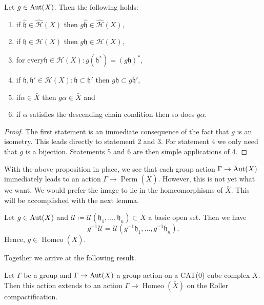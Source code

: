 \begin{prop}
  Let \(g \in \operatorname{Aut}(X)\). Then the following holds:
  \begin{enumerate}
  \item if \(\mathfrak{\hat h} \in \mathcal{\hat H}(X)\) then \( g\mathfrak{\hat h} \in \mathcal{\hat H}(X)\),
  \item if \(\mathfrak{h} \in \mathcal{H}(X)\) then \( g\mathfrak{h} \in \mathcal{H}(X)\),
  \item for every\(\mathfrak{h} \in \mathcal{H}(X)\colon g(\mathfrak{h}^\ast) = (g\mathfrak{h})^\ast\),
  \item if \(\mathfrak{h,h'} \in \mathcal{H}(X)\colon \mathfrak{h} \subset \mathfrak{h'}\) then \(g\mathfrak{h} \subset g\mathfrak{h'}\),
  \item if\(\alpha \in \bar X\) then \(g\alpha \in \bar X\) and
  \item if \(\alpha\) satisfies the descending chain condition then so does \(g\alpha\).
  \end{enumerate}
\end{prop}

\begin{proof}
  The first statement is an immediate consequence of the fact that \(g\) is an isometry. This leads directly to statement 2 and 3. For statement 4 we only need that \(g\) is a bijection. Statements 5 and 6 are then simple applications of 4.
\end{proof}

With the above proposition in place, we see that each group action \(\Gamma \to \operatorname{Aut}(X)\) immediately leads to an action \(\Gamma \to \operatorname{Perm}(\bar X)\). However, this is not yet what we want. We would prefer the image to lie in the homeomorphisms of \(\bar X\). This will be accomplished with the next lemma.

\begin{lemma}
  Let \(g \in \operatorname{Aut}(X)\) and \(\mathcal{U} \coloneqq \mathcal{U}(\mathfrak{h}_1, \dots, \mathfrak{h}_n) \subset \bar X\) a basic open set. Then we have
  \[
    g^{-1} \mathcal{U} = \mathcal{U}(g^{-1}\mathfrak{h}_1, \dots, g^{-1}\mathfrak{h}_n).
  \]
  Hence, \(g \in \operatorname{Homeo}(\bar X)\).
\end{lemma}

Together we arrive at the following result.

\begin{thm}
  \label{thm:roller-action}
  Let \(\Gamma\) be a group and \(\Gamma \to \operatorname{Aut}(X)\) a group action on a CAT(0) cube complex \(X\). Then this action extends to an action \(\Gamma \to \operatorname{Homeo}(\bar X)\) on the Roller compactification.
\end{thm}

